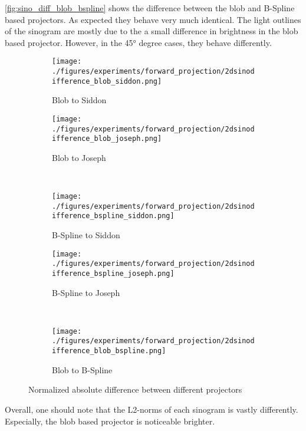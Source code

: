 \autoref{fig:sino_diff_blob_bspline} shows the difference between the blob and B-Spline based
projectors. As expected they behave very much identical. The light outlines of the sinogram are
mostly due to the a small difference in brightness in the blob based projector. However, in the 45°
degree cases, they behave differently. 

\begin{figure}[h]
	\centering
	\begin{subfigure}[b]{0.45\textwidth}
		\centering
		\texttt{[image: ./figures/experiments/forward\_projection/2dsinodifference\_blob\_siddon.png]}
		\caption{Blob to Siddon}\label{fig:sino_diff_blob_siddon}
	\end{subfigure}
	\begin{subfigure}[b]{0.45\textwidth}
		\centering
		\texttt{[image: ./figures/experiments/forward\_projection/2dsinodifference\_blob\_joseph.png]}
		\caption{Blob to Joseph}\label{fig:sino_diff_blob_joseph}
	\end{subfigure} \\
	\begin{subfigure}[b]{0.45\textwidth}
		\centering
		\texttt{[image: ./figures/experiments/forward\_projection/2dsinodifference\_bspline\_siddon.png]}
		\caption{B-Spline to Siddon}\label{fig:sino_diff_bspline_siddon}
	\end{subfigure}
	\begin{subfigure}[b]{0.45\textwidth}
		\centering
		\texttt{[image: ./figures/experiments/forward\_projection/2dsinodifference\_bspline\_joseph.png]}
		\caption{B-Spline to Joseph}\label{fig:sino_diff_bspline_joseph}
	\end{subfigure}\\
	\begin{subfigure}[b]{0.45\textwidth}
		\centering
		\texttt{[image: ./figures/experiments/forward\_projection/2dsinodifference\_blob\_bspline.png]}
		\caption{Blob to B-Spline}\label{fig:sino_diff_blob_bspline}
	\end{subfigure}
	\caption{Normalized absolute difference between different projectors}%
	\label{fig:sino_differences}
\end{figure}

Overall, one should note that the L2-norms of each sinogram is vastly differently. Especially, the
blob based projector is noticeable brighter. 

